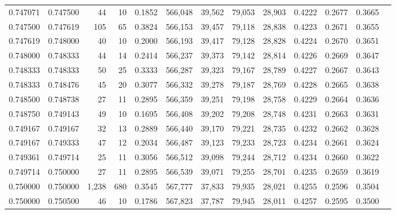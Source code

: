 \begin{tabular}{rrrrrrrrrrrrr}
0.747071 & 0.747500 &    44 &  10 &                                     0.1852 & 566,048 &  39,562 &  79,053 &  28,903 & 0.4222 & 0.2677 & 0.3665 \\
0.747500 & 0.747619 &   105 &  65 &                                     0.3824 & 566,153 &  39,457 &  79,118 &  28,838 & 0.4223 & 0.2671 & 0.3655 \\
0.747619 & 0.748000 &    40 &  10 &                                     0.2000 & 566,193 &  39,417 &  79,128 &  28,828 & 0.4224 & 0.2670 & 0.3651 \\
0.748000 & 0.748333 &    44 &  14 &                                     0.2414 & 566,237 &  39,373 &  79,142 &  28,814 & 0.4226 & 0.2669 & 0.3647 \\
0.748333 & 0.748333 &    50 &  25 &                                     0.3333 & 566,287 &  39,323 &  79,167 &  28,789 & 0.4227 & 0.2667 & 0.3643 \\
0.748333 & 0.748476 &    45 &  20 &                                     0.3077 & 566,332 &  39,278 &  79,187 &  28,769 & 0.4228 & 0.2665 & 0.3638 \\
0.748500 & 0.748738 &    27 &  11 &                                     0.2895 & 566,359 &  39,251 &  79,198 &  28,758 & 0.4229 & 0.2664 & 0.3636 \\
0.748750 & 0.749143 &    49 &  10 &                                     0.1695 & 566,408 &  39,202 &  79,208 &  28,748 & 0.4231 & 0.2663 & 0.3631 \\
0.749167 & 0.749167 &    32 &  13 &                                     0.2889 & 566,440 &  39,170 &  79,221 &  28,735 & 0.4232 & 0.2662 & 0.3628 \\
0.749167 & 0.749333 &    47 &  12 &                                     0.2034 & 566,487 &  39,123 &  79,233 &  28,723 & 0.4234 & 0.2661 & 0.3624 \\
0.749361 & 0.749714 &    25 &  11 &                                     0.3056 & 566,512 &  39,098 &  79,244 &  28,712 & 0.4234 & 0.2660 & 0.3622 \\
0.749714 & 0.750000 &    27 &  11 &                                     0.2895 & 566,539 &  39,071 &  79,255 &  28,701 & 0.4235 & 0.2659 & 0.3619 \\
0.750000 & 0.750000 & 1,238 & 680 &                                     0.3545 & 567,777 &  37,833 &  79,935 &  28,021 & 0.4255 & 0.2596 & 0.3504 \\
0.750000 & 0.750500 &    46 &  10 &                                     0.1786 & 567,823 &  37,787 &  79,945 &  28,011 & 0.4257 & 0.2595 & 0.3500 \\

\end{tabular}
